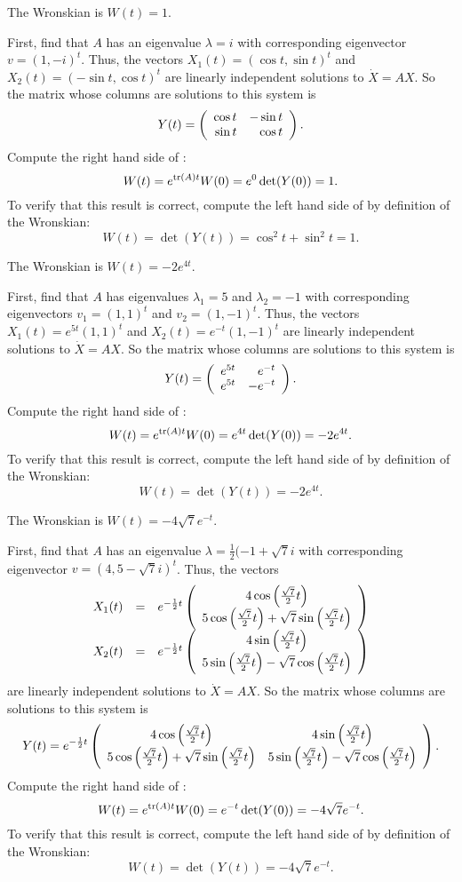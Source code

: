  \ans The Wronskian is $W(t) = 1$.

\soln First, find that $A$ has an eigenvalue $\lambda = i$ with corresponding
eigenvector $v = (1,-i)^t$.  Thus, the vectors $X_1(t) = (\cos t, \sin t)^t$
and $X_2(t) = (-\sin t, \cos t)^t$ are linearly independent solutions to
$\dot{X} = AX$.  So the matrix whose columns are solutions to this system
is
\[
Y(t) = \left(\begin{array}{rr} \cos t & -\sin t\\ \sin t &\cos t\end{array}\right).
\]
Compute the right hand side of :
\[
W(t) = e^{{\rm tr}(A)t}W(0) = e^0\det(Y(0)) = 1.
\]
To verify that this result is correct, compute the left hand side of
 by definition of the Wronskian:
\[
W(t) = \det(Y(t)) = \cos^2 t + \sin^2 t = 1.
\]

 \ans The Wronskian is $W(t) = -2e^{4t}$.

\soln First, find that $A$ has eigenvalues $\lambda_1 = 5$ and
$\lambda_2 = -1$ with corresponding eigenvectors $v_1 = (1,1)^t$ and
$v_2 = (1,-1)^t$.  Thus, the vectors $X_1(t) = e^{5t}(1,1)^t$ and
$X_2(t) = e^{-t}(1,-1)^t$ are linearly independent solutions to
$\dot{X} = AX$.  So the matrix whose columns are solutions to this
system is
\[
Y(t) = \left(\begin{array}{rr} e^{5t} & e^{-t}\\ e^{5t} &-e^{-t}\end{array}\right).
\]
Compute the right hand side of :
\[
W(t) = e^{{\rm tr}(A)t}W(0) = e^{4t}\det(Y(0)) = -2e^{4t}.
\]
To verify that this result is correct, compute the left hand side of
 by definition of the Wronskian:
\[
W(t) = \det(Y(t)) = -2e^{4t}.
\]

 \ans The Wronskian is $W(t) = -4\sqrt{7}e^{-t}$.

\soln First, find that $A$ has an eigenvalue $\lambda =
\frac{1}{2}(-1 + \sqrt{7}i$ with corresponding
eigenvector $v = (4,5 - \sqrt{7}i)^t$.  Thus, the vectors
\[
\begin{array}{rcl}
X_1(t) & = & e^{-\frac{1}{2}t}\left(\begin{array}{c} 4\cos\left(\frac{\sqrt{7}}{2}t\right) \\ 5\cos\left(\frac{\sqrt{7}}{2}t\right) +
\sqrt{7}\sin\left(\frac{\sqrt{7}}{2}t\right)\end{array}\right) \\
X_2(t) & = & e^{-\frac{1}{2}t}\left(\begin{array}{c} 4\sin\left(\frac{\sqrt{7}}{2}t\right) \\ 5\sin\left(\frac{\sqrt{7}}{2}t\right) -
\sqrt{7}\cos\left(\frac{\sqrt{7}}{2}t\right)\end{array}\right)
\end{array}
\]
are linearly independent solutions to $\dot{X} = AX$.  So the matrix
whose columns are solutions to this system is
\[
Y(t) = e^{-\frac{1}{2}t}\left(\begin{array}{cc} 4\cos\left(\frac{\sqrt{7}}{2}t\right) & 4\sin\left(\frac{\sqrt{7}}{2}t\right)\\ 5\cos\left(\frac{\sqrt{7}}{2}t\right) +
\sqrt{7}\sin\left(\frac{\sqrt{7}}{2}t\right) &5\sin\left(\frac{\sqrt{7}}{2}t\right) -
\sqrt{7}\cos\left(\frac{\sqrt{7}}{2}t\right)\end{array}\right).
\]
Compute the right hand side of :
\[
W(t) = e^{{\rm tr}(A)t}W(0) = e^{-t}\det(Y(0)) = -4\sqrt{7}e^{-t}.
\]
To verify that this result is correct, compute the left hand side of
 by definition of the Wronskian:
\[
W(t) = \det(Y(t)) = -4\sqrt{7}e^{-t}.
\]



